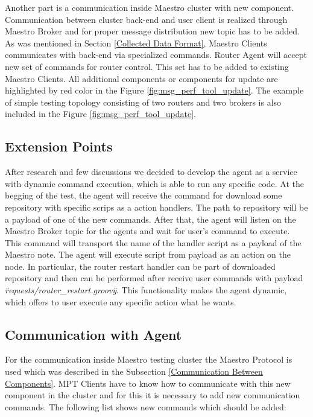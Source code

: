 Another part is a communication inside Maestro cluster with new component. Communication between cluster back-end and user client is realized through Maestro Broker and for proper message distribution new topic has to be added. As was mentioned in Section \ref{Collected Data Format}, Maestro Clients communicates with back-end via specialized commands. Router Agent will accept new set of commands for router control. This set has to be added to existing Maestro Clients. All additional components or components for update are highlighted by red color in the Figure \ref{fig:msg_perf_tool_update}. The example of simple testing topology consisting of two routers and two brokers is also included in the Figure \ref{fig:msg_perf_tool_update}.


\subsection{Extension Points}
\label{Extension Points}
After research and few discussions we decided to develop the agent as a service with dynamic command execution, which is able to run any specific code. At the begging of the test, the agent will receive the command for download some repository with specific scrips as a action handlers. The path to repository will be a payload of one of the new commands. After that, the agent will listen on the Maestro Broker topic for the agents and wait for user's command to execute. This command will transport the name of the handler script as a payload of the Maestro note. The agent will execute script from payload as an action on the node. In particular, the router restart handler can be part of downloaded repository and then can be performed after receive user commands with payload \emph{\"requests/router\_restart.groovy\"}. This functionality makes the agent dynamic, which offers to user execute any specific action what he wants.


\subsection{Communication with Agent}
\label{Communication with Agent}
For the communication inside Maestro testing cluster the Maestro Protocol is used which was described in the Subsection \ref{Communication Between Components}. MPT Clients have to know how to communicate with this new component in the cluster and for this it is necessary to add new communication commands. The following list shows new commands which should be added:

